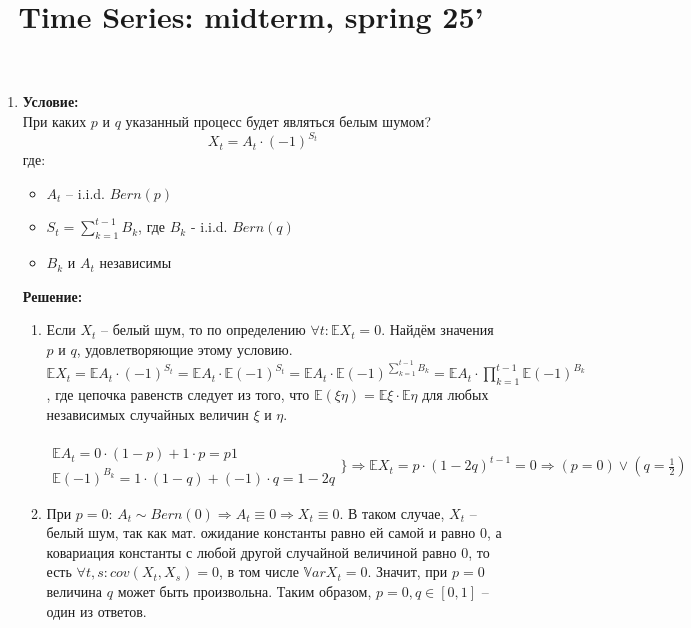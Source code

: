 \documentclass{article}
\title{Time Series: midterm, spring 25'}
\begin{document}
\date{}

\maketitle

\begin{enumerate}
\item \textbf{Условие:} \\
При каких $p$ и $q$ указанный процесс будет являться белым шумом?
$$X_t = A_t\cdot(-1)^{S_t}$$
где:
\begin{itemize}
    \item $A_t$ -- i.i.d. $Bern(p)$
    \item $S_t = \sum\limits_{k=1}^{t-1} B_k$, где $B_k$ - i.i.d. $Bern(q)$
    \item $B_k$ и $A_t$ независимы
\end{itemize}

\textbf{Решение:}

\begin{enumerate}[label=(\arabic*)]
    \item Если $X_t$ -- белый шум, то по определению $\forall t:\mathbb{E}X_t = 0$.
    Найдём значения $p$ и $q$, удовлетворяющие этому условию.
    $\mathbb{E}X_t = \mathbb{E}A_t\cdot(-1)^{S_t} = \mathbb{E}A_t\cdot\mathbb{E}(-1)^{S_t} = \mathbb{E}A_t\cdot\mathbb{E}(-1)^{\sum\limits_{k=1}^{t-1} B_k} = \mathbb{E}A_t\cdot\prod\limits_{k=1}^{t-1}\mathbb{E}(-1)^{B_k}$, где
    цепочка равенств следует из того, что $\mathbb{E}(\xi\eta) = \mathbb{E}\xi\cdot\mathbb{E}\eta$ для любых независимых случайных величин $\xi$ и $\eta$. \\\\
    \begin{math}
        \begin{array}{l}
            \mathbb{E}A_t = 0\cdot(1 - p) + 1\cdot p = p1 \\
            \mathbb{E}(-1)^{B_k} = 1\cdot(1-q) + (-1)\cdot q = 1 - 2q
        \end{array}
        \biggr\} \Rightarrow \mathbb{E}X_t = p\cdot(1-2q)^{t-1} = 0\Rightarrow(p=0)\lor(q=\frac{1}{2})
    \end{math}

    \item При $p=0$: $A_t \sim Bern(0) \Rightarrow A_t \equiv 0\Rightarrow X_t \equiv 0$. В таком случае, $X_t$ -- белый шум, так как мат. ожидание константы
    равно ей самой и равно $0$, а ковариация константы с любой другой случайной величиной равно $0$, то есть $\forall t, s: cov(X_t, X_s) = 0$, в том числе $\mathbb{V}ar X_t = 0$.
    Значит, при $p=0$ величина $q$ может быть произвольна. Таким образом, $p=0, q\in[0, 1]$ -- один из ответов.


\end{enumerate}
\end{enumerate}
\end{document}

